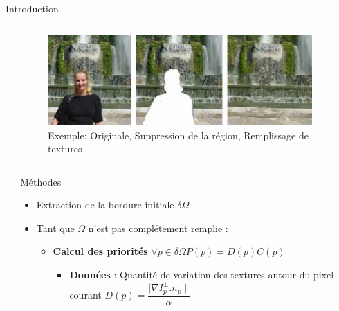\documentclass[final,hyperref={pdfpagelabels=false}]{beamer}
\begin{document}
\begin{frame}[t]
\begin{columns}[t]
\begin{column}{.930\textwidth}
\begin{block}{\Large Introduction}
\begin{columns}[t]
\begin{column}{.3\textwidth}
\end{column}

\begin{column}{.29\textwidth}

\begin{figure}[hb] %
\includegraphics[width=1.0\linewidth]{inpaintingex.jpeg}
\caption{Exemple:  Originale, Suppression de la région, Remplissage de textures }
\label{example}
\end{figure}
\end{column}

\end{columns}
\end{block}
\end{column}


\begin{column}{.02\textwidth} \end{column}
\end{columns}

\begin{columns}[t]

\begin{column}{.02\textwidth} \end{column}

\begin{column}{.465\textwidth} 


\begin{block}{\Large Méthodes}
 

\begin{itemize}


\item Extraction de la bordure initiale $\delta \Omega$
\item Tant que $\Omega$ n'est pas complétement remplie : 

\begin{itemize}



\item \textbf{Calcul des priorités} $\forall p \in \delta\Omega P(p)=D(p)C(p) $
\begin{itemize}
\item \textbf{Données} : Quantité de variation des textures autour du pixel courant $D(p) = \dfrac{\mid \nabla I_p^{\perp}.n_p \mid}{\alpha} $



\end{itemize}
\end{itemize}
\end{itemize}
\end{block}
\end{column}
\end{columns}
\end{frame}
\end{document}
